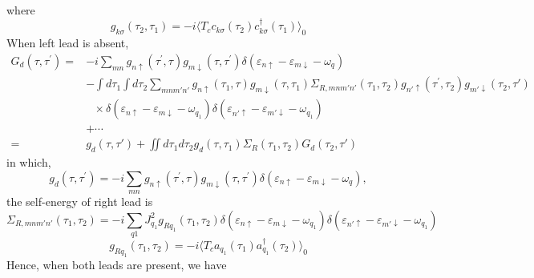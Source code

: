 where
\begin{equation}
g_{k\sigma}(\tau_{2}, \tau_{1}) = -i\langle T_{c}c_{k\sigma}(\tau_{2}) c_{k\sigma}^{\dag}(\tau_{1})\rangle_{0}
\end{equation}
When left lead is absent,
\begin{equation}
\begin{split}
G_{d}\left(\tau, \tau^{\prime}\right) =&-i\sum_{mn} g_{n \uparrow}\left(\tau^{\prime}, \tau\right) g_{m \downarrow}\left(\tau, \tau^{\prime}\right) \delta(\varepsilon_{n\uparrow} - \varepsilon_{m\downarrow} - \omega_{q})\\
&-\int d\tau_{1}\int d\tau_{2} \sum_{mnm'n'}g_{n \uparrow}\left(\tau_{1}, \tau\right) g_{m \downarrow}\left(\tau, \tau_{1}\right) \Sigma_{R,mnm'n' }\left(\tau_{1}, \tau_{2}\right) g_{n'\uparrow}\left(\tau^{\prime}, \tau_{2}\right)g_{m'\downarrow}(\tau_{2}, \tau') \\
&~~~\times \delta(\varepsilon_{n\uparrow} - \varepsilon_{m\downarrow} - \omega_{q_{1}})\delta(\varepsilon_{n'\uparrow} - \varepsilon_{m'\downarrow} - \omega_{q_{1}})\\
& + \cdots \\
=& g_{d}(\tau, \tau') + \iint d\tau_{1}d\tau_{2}g_{d}(\tau, \tau_{1}) \Sigma_{R}(\tau_{1}, \tau_{2}) G_{d}(\tau_{2}, \tau')
\end{split}
\end{equation}
in which, 
\begin{equation}
g_{d}\left(\tau, \tau^{\prime}\right) = -i\sum_{mn} g_{n \uparrow}\left(\tau^{\prime}, \tau\right) g_{m \downarrow}\left(\tau, \tau^{\prime}\right) \delta(\varepsilon_{n\uparrow} - \varepsilon_{m\downarrow} - \omega_{q}),
\end{equation}
the self-energy of right lead is
\begin{equation}
\Sigma_{R,mnm'n'}(\tau_{1}, \tau_{2}) = -i\sum_{q1}J_{q_{1}}^{2} g_{Rq_{1}}(\tau_{1}, \tau_{2}) \delta(\varepsilon_{n\uparrow} - \varepsilon_{m\downarrow} - \omega_{q_{1}})\delta(\varepsilon_{n'\uparrow} - \varepsilon_{m'\downarrow} - \omega_{q_{1}})
\end{equation}
\begin{equation}
g_{Rq_{1}}(\tau_{1}, \tau_{2}) = -i\langle T_{c}a_{q_{1}}(\tau_{1}) a_{q_{1}}^{\dag}(\tau_{2})\rangle_{0}
\end{equation}
Hence, when both leads are present, we have
